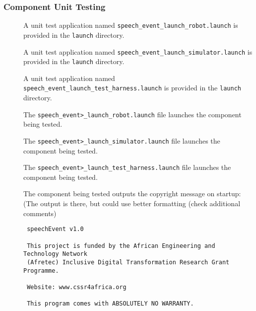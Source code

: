 \documentclass{CSSRforAfrica}
\newcommand{\checkboxChecked}{\fbox{\ding{51}}} %
\newcommand{\checkboxDashed}{\fbox{--}}         %
\begin{document}
\newpage
\subsubsection{Component Unit Testing}
\label{subsubsection:speech_event_unit_testing}

\begin{description}

\item[\checkboxDashed] A unit test application named {\small \verb+speech_event_launch_robot.launch+} is provided in the {\small \verb+launch+} directory.

\item[\checkboxDashed] A unit test application named {\small \verb+speech_event_launch_simulator.launch+} is provided in the {\small \verb+launch+} directory.

\item[\checkboxDashed] A unit test application named {\small \verb+speech_event_launch_test_harness.launch+} is provided in the {\small \verb+launch+} directory.

\item[\checkboxDashed] The {\small \verb+speech_event>_launch_robot.launch+} file launches the component being tested.

\item[\checkboxDashed] The {\small \verb+speech_event>_launch_simulator.launch+} file launches the component being tested.

\item[\checkboxDashed] The {\small \verb+speech_event>_launch_test_harness.launch+} file launches the component being tested.

\item[\checkboxChecked] The component being tested outputs the copyright message on startup: (The output is there, but could use better formatting (check additional comments)
{\small 
\begin{verbatim}
 speechEvent v1.0
 
 This project is funded by the African Engineering and Technology Network 
 (Afretec) Inclusive Digital Transformation Research Grant Programme.
 
 Website: www.cssr4africa.org
 
 This program comes with ABSOLUTELY NO WARRANTY.
\end{verbatim}}


\end{description}
\end{document}
